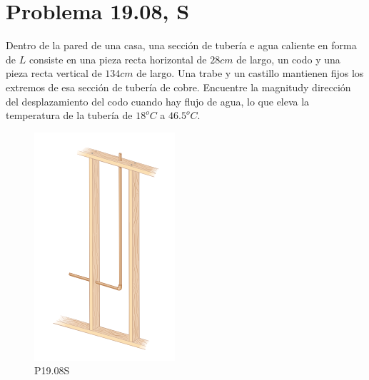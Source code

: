 \section*{Problema 19.08, S}

Dentro de la pared de una casa, una sección de tubería e agua caliente en forma de $L$ consiste en una pieza recta horizontal de $28cm$ de largo, un codo y una pieza recta vertical de $134cm$ de largo. Una trabe y un castillo mantienen fijos los extremos de esa sección de tubería de cobre. Encuentre la magnitudy dirección del desplazamiento del codo cuando hay flujo de agua, lo que eleva la temperatura de la tubería de $18^o C$ a $46.5^o C$.



\begin{figure}[H]
	\centering
	\includegraphics[scale=0.5]{./img/tubo.png}
	\caption{P19.08S}
\end{figure}




